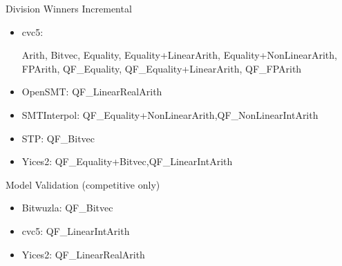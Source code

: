 \documentclass[table]{beamer}
\def\emph#1{\textcolor{MYblue}{#1}}
\begin{document}
\begin{frame}{Division Winners}
  \emph{Incremental}
  \begin{itemize}
  \item \emph{cvc5}: \begin{minipage}{.8\textwidth}\raggedright \tiny Arith, Bitvec, Equality, Equality+LinearArith, Equality+NonLinearArith, FPArith, QF\_Equality, QF\_Equality+LinearArith, QF\_FPArith\end{minipage}
  \item \emph{OpenSMT}: {\small QF\_LinearRealArith}
  \item \emph{SMTInterpol}: {\small QF\_Equality+NonLinearArith,QF\_NonLinearIntArith}
  \item \emph{STP}: {\small QF\_Bitvec}
  \item \emph{Yices2}: {\small QF\_Equality+Bitvec,QF\_LinearIntArith}
  \end{itemize}
  \medskip

  \pause
  \emph{Model Validation (competitive only)}
  \begin{itemize}
  \item \emph{Bitwuzla}: {\small QF\_Bitvec}
  \item \emph{cvc5}: {\small QF\_LinearIntArith}
  \item \emph{Yices2}: {\small QF\_LinearRealArith}
  \end{itemize}
\end{frame}
\end{document}
